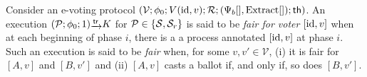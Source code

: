 \begin{definition}
\label{def:fairness}
Consider an e-voting protocol
  $(\mathcal{V};
  \phi_0;
  V(\mathrm{id},v); 
  \mathcal{R};
  (\Psi_b[],\mathrm{Extract}[]);
  \mathsf{th})$.
  An execution
  $(\p;\phi_0;1)\sint{\tr}K$ for $\mathcal{P}\in\{\mathcal{S},\mathcal{S}_r\}$ is said to be
  {\em fair for voter $[\mathrm{id},v]$}
  when at each beginning of phase $i$, there is a a process annotated $[\mathrm{id},v]$ at phase $i$.
  Such an execution is said to be {\em fair} when, for some $v,v'\in\mathcal{V}$,
  (i) it is fair for $[A,v]$ and $[B,v']$ and
  (ii) $[A,v]$ casts a ballot if, and only if, so does $[B,v']$.
\end{definition}

